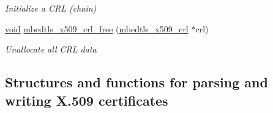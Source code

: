 \begin{DoxyCompactItemize}
\begin{DoxyCompactList}\small\item\em Initialize a C\+RL (chain) \end{DoxyCompactList}\item 
\hyperlink{interfacevoid}{void} \hyperlink{group__x509__module_gaeb19c3326889f9e493fbd605c1113b96}{mbedtls\+\_\+x509\+\_\+crl\+\_\+free} (\hyperlink{structmbedtls__x509__crl}{mbedtls\+\_\+x509\+\_\+crl} $\ast$crl)
\begin{DoxyCompactList}\small\item\em Unallocate all C\+RL data \end{DoxyCompactList}\end{DoxyCompactItemize}
\subsection*{Structures and functions for parsing and writing X.509 certificates}
